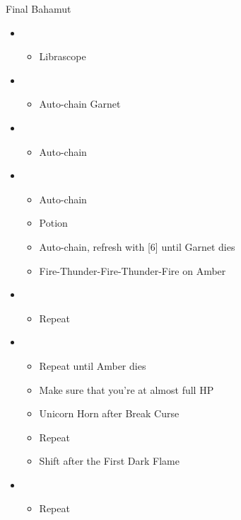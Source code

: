 \begin{battle}{Final Bahamut}
  \begin{flushleft}
    \begin{itemize}
      \item \sixth
            \begin{itemize}
              \item Librascope
            \end{itemize}
      \item \fifth
            \begin{itemize}
              \item Auto-chain Garnet
            \end{itemize}
      \item \third
            \begin{itemize}
              \item Auto-chain
            \end{itemize}
      \item \fifth
            \begin{itemize}
              \item Auto-chain
              \item Potion
              \item Auto-chain, refresh with [6] until Garnet dies
              \item Fire-Thunder-Fire-Thunder-Fire on Amber
            \end{itemize}
      \item \third
            \begin{itemize}
              \item Repeat
            \end{itemize}
      \item \fifth
            \begin{itemize}
              \item Repeat until Amber dies
              \item Make sure that you're at almost full HP
              \item Unicorn Horn after Break Curse
              \item Repeat
              \item Shift after the First Dark Flame
            \end{itemize}
      \item \second
            \begin{itemize}
              \item Repeat

\end{itemize}
\end{itemize}
\end{flushleft}
\end{battle}
